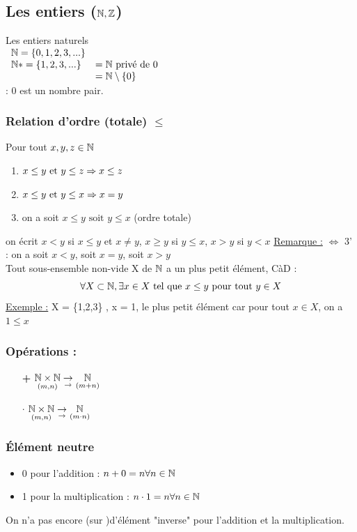 \documentclass[12pt,a4paper]{article}
\begin{document}
\subsection{Les entiers ($\mathbb{N}, \mathbb{Z}$)}
Les entiers naturels \\
$\begin{array}{ll}
\mathbb{N} = \{0, 1, 2, 3,...\}\\
\mathbb{N}* = \{1,2,3,...\} & = \mathbb{N} \mbox{ privé de } 0 \\
&= \mathbb{N}\setminus \{0\}
\end{array}$\\
 : 0 est un nombre pair.

\subsubsection{Relation d'ordre (totale) $\leq$}
Pour tout $x, y, z \in \mathbb{N}$
\begin{enumerate}
\item $x \leq y \mbox{ et } y \leq z \Rightarrow x \leq z$
\item $x \leq y \mbox{ et } y \leq x \Rightarrow x = y$
\item on a soit $x \leq y \mbox{ soit } y \leq x$ (ordre totale)
\end{enumerate}
 on écrit $x<y$ si $x \leq y$ et $x \neq y$, $x \geq y$ si $y \leq x$, $x > y$ si $y < x$
\underline{Remarque :} $\Leftrightarrow$ 3' : on a soit $x < y$, soit $x = y$, soit $x > y$\\
 Tout sous-ensemble non-vide X de $\mathbb{N}$ a un plus petit élément, CàD :
\begin{equation}
\forall X \subset \mathbb{N}, \exists x \in X \mbox{ tel que }x \leq y\mbox{ pour tout }y \in X
\end{equation}
\underline{Exemple :} X = \{1,2,3\} , x = 1, le plus petit élément car pour tout $x \in X$, on a $1 \leq x$

\subsubsection{Opérations :}
\begin{itemize}
\item[\textbf{+}] $\underset{(m,n)}{\mathbb{N} \times \mathbb{N}} \underset{\to}{\to} \underset{(m+n)}{\mathbb{N}}$	 
\item[\textbf{$\cdot$}] $\underset{(m,n)}{\mathbb{N} \times \mathbb{N}} \underset{\to}{\to} \underset{(m\cdot n)}{\mathbb{N}}$	 
\end{itemize}
\subsubsection{Élément neutre}
\begin{itemize}
\item 0 pour l'addition : $n+0 = n \forall n \in \mathbb{N}$
\item 1 pour la multiplication : $n \cdot 1 = n \forall n \in \mathbb{N}$
\end{itemize}
On n'a pas encore (sur \N)d'élément "inverse" pour l'addition et la multiplication.
\end{document}

